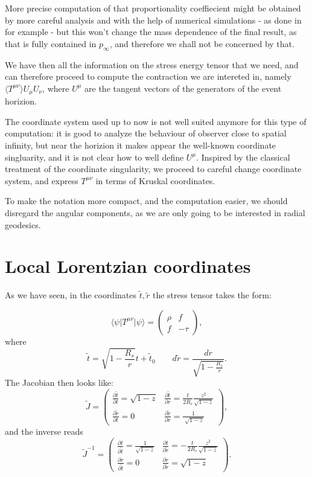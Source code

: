 More precise computation of that proportionality coeffiecient might be obtained by more careful analysis and with the help of numerical simulations - as done in \cite[]{visser1997gravitational} for example - but this won't change the mass dependence of the final result, as that is fully contained in \(p_{\infty}\), and therefore we shall not be concerned by that.

We have then all the information on the stress energy tensor that we need, and can therefore proceed to compute the contraction we are intereted in, namely \(\langle T^{\mu\nu}\rangle U_{\mu}U_{\nu}\), where \(U^{\mu}\) are the tangent vectors of the generators of the event horizion.

The coordinate system used up to now is not well suited anymore for this type of computation: it is good to analyze the behaviour of observer close to spatial infinity, but near the horizion it makes appear the well-known coordinate singluarity, and it is not clear how to well define \(U^{\mu}\). Inspired by the classical treatment of the coordinate singularity, we proceed to careful change coordinate system, and express \(T^{\mu\nu}\) in terms of Kruskal coordinates.

To make the notation more compact, and the computation easier, we should disregard the angular components, as we are only going to be interested in radial geodesics.

\section{Local Lorentzian coordinates}
As we have seen, in the coordinates \(\tilde{t}, \tilde{r}\) the stress tensor takes the form:

\[
    \langle\psi\vert T^{\mu\nu}\vert\psi\rangle = 
    \begin{pmatrix}
        \rho & f \\
        f & -\tau
    \end{pmatrix} ,
\]
where
\[
\tilde{t} = \sqrt{1 - \frac{R_s}{r}} t + \tilde{t}_0 \quad \quad d\tilde{r} = \frac{dr}{\sqrt{1 - \frac{R_s}{r}}}.
\]
The Jacobian then looks like:
\[
\tilde{J} = \begin{pmatrix}
    \frac{\partial \tilde{t}}{\partial t} = \sqrt{1 - z} & \frac{\partial \tilde{t}}{\partial r} = \frac{t}{2R_s} \frac{z^2}{\sqrt{1 - z}} \\
    \frac{\partial \tilde{r}}{\partial t} = 0 & \frac{\partial \tilde{r}}{\partial r} = \frac{1}{\sqrt[]{1 - z}}
\end{pmatrix},   
\]
and the inverse reads
\[
\tilde{J}^{- 1} = \begin{pmatrix}
    \frac{\partial t}{\partial \tilde{t}} = \frac{1}{\sqrt{1 - z}} & \frac{\partial t}{\partial \tilde{r}} = -\frac{t}{2R_s} \frac{z^2}{\sqrt{1 - z}} \\
    \frac{\partial r}{\partial \tilde{t}} = 0 & \frac{\partial r}{\partial \tilde{r}} = \sqrt{1 - z}
\end{pmatrix}.   
\]

